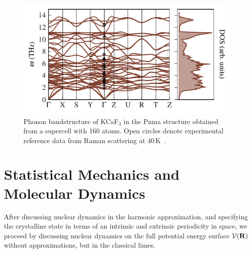 \begin{figure}
	\includegraphics[width=\textwidth]{./data/plots/anharmonicity/3_bandstructures/KCaF3/bands_dos_emb.pdf}
	\caption{
		Phonon bandstructure of KCaF$_3$ in the Pnma structure obtained from a supercell with 160 atoms. Open circles denote experimental reference data from Raman scattering at 40\,K~\cite{Daniel1997}.
	}
	\label{fig:ha.dispersion.kcaf3}
\end{figure}



\newpage

\section{Statistical Mechanics and Molecular Dynamics}
After discussing nuclear dynamics in the harmonic approximation, and specifying the crystalline state in terms of an intrinsic and extrinsic periodicity in space, we proceed by discussing nuclear dynamics on the full potential energy surface $\mathcal{V} ({\bf R})$ without approximations, but in the classical limes.

